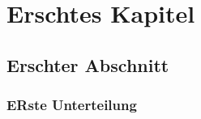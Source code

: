 \documentclass{book}
\begin{document}
\chapter{Erschtes Kapitel}

\section{Erschter Abschnitt}

\subsection{ERste Unterteilung}
\end{document}
